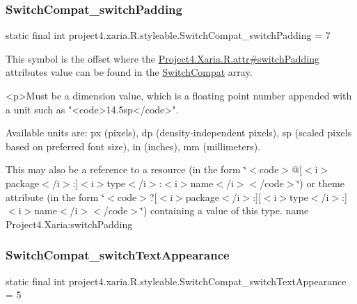 \subsubsection{\texorpdfstring{Switch\+Compat\+\_\+switch\+Padding}{SwitchCompat\_switchPadding}}
{\footnotesize\ttfamily static final int project4.\+xaria.\+R.\+styleable.\+Switch\+Compat\+\_\+switch\+Padding = 7\hspace{0.3cm}{\ttfamily [static]}}

This symbol is the offset where the \hyperlink{}{Project4.\+Xaria.\+R.\+attr\#switch\+Padding} attribute\textquotesingle{}s value can be found in the \hyperlink{classproject4_1_1xaria_1_1R_1_1styleable_a15d9950df3a97e57d9c57e4c4b7e8e87}{Switch\+Compat} array.

\begin{DoxyVerb}      <p>Must be a dimension value, which is a floating point number appended with a unit such as "<code>14.5sp</code>".
\end{DoxyVerb}
 Available units are\+: px (pixels), dp (density-\/independent pixels), sp (scaled pixels based on preferred font size), in (inches), mm (millimeters). 

This may also be a reference to a resource (in the form \char`\"{}$<$code$>$@\mbox{[}$<$i$>$package$<$/i$>$\+:\mbox{]}$<$i$>$type$<$/i$>$\+:$<$i$>$name$<$/i$>$$<$/code$>$\char`\"{}) or theme attribute (in the form \char`\"{}$<$code$>$?\mbox{[}$<$i$>$package$<$/i$>$\+:\mbox{]}\mbox{[}$<$i$>$type$<$/i$>$\+:\mbox{]}$<$i$>$name$<$/i$>$$<$/code$>$\char`\"{}) containing a value of this type.  name Project4.\+Xaria\+:switch\+Padding \mbox{\label{classproject4_1_1xaria_1_1R_1_1styleable_a8e811c82f279d1bba5afc81c9708b5a6}} 
\subsubsection{\texorpdfstring{Switch\+Compat\+\_\+switch\+Text\+Appearance}{SwitchCompat\_switchTextAppearance}}
{\footnotesize\ttfamily static final int project4.\+xaria.\+R.\+styleable.\+Switch\+Compat\+\_\+switch\+Text\+Appearance = 5\hspace{0.3cm}{\ttfamily [static]}}

